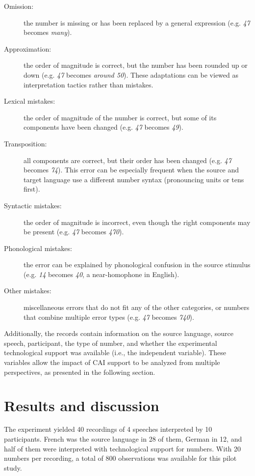 \documentclass[output=paper]{langsci/langscibook}
\begin{document}
\begin{description}
\item[Omission:] the number is missing or has been replaced by a general expression (e.g. \textit{47} becomes \textit{many}).
\item[Approximation:] the order of magnitude is correct, but the number has been rounded up or down (e.g. \textit{47} becomes \textit{around 50}). These adaptations can be viewed as interpretation tactics rather than mistakes.
\item[Lexical mistakes:] the order of magnitude of the number is correct, but some of its components have been changed (e.g. \textit{47} becomes \textit{49}).
\item[Transposition:] all components are correct, but their order has been changed (e.g. \textit{47} becomes \textit{74}). This error can be especially frequent when the source and target language use a different number syntax (pronouncing units or tens first).
\item[Syntactic mistakes:] the order of magnitude is incorrect, even though the right components may be present (e.g. \textit{47} becomes \textit{470}).
\item[Phonological mistakes:] the error can be explained by phonological confusion in the source stimulus (e.g. \textit{14} becomes \textit{40}, a near-homophone in English).
\item[Other mistakes:] miscellaneous errors that do not fit any of the other categories, or numbers that combine multiple error types (e.g. \textit{47} becomes \textit{740}).
\end{description}

Additionally, the records contain information on the source language, source speech, participant, the type of number, and whether the experimental technological support was available (i.e., the independent variable). These variables allow the impact of CAI support to be analyzed from multiple perspectives, as presented in the following section.

\section{Results and discussion}
The experiment yielded 40 recordings of 4 speeches interpreted by 10 participants. French was the source language in 28 of them, German in 12, and half of them were interpreted with technological support for numbers. With 20 numbers per recording, a total of 800 observations was available for this pilot study.
\end{document}
